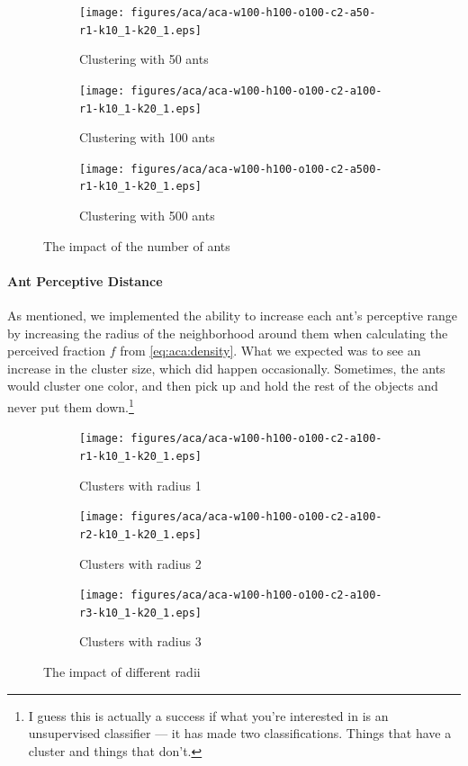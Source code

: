 \documentclass[12pt]{article}
\begin{document}
\begin{figure}[H]
    \begin{subfigure}[b]{0.32\textwidth}
        \centering
        \texttt{[image: figures/aca/aca-w100-h100-o100-c2-a50-r1-k10\_1-k20\_1.eps]}
        \caption{Clustering with 50 ants}\label{fig:aca:num-ants-50}
    \end{subfigure}
    \begin{subfigure}[b]{0.32\textwidth}
        \centering
        \texttt{[image: figures/aca/aca-w100-h100-o100-c2-a100-r1-k10\_1-k20\_1.eps]}
        \caption{Clustering with 100 ants}\label{fig:aca:num-ants-100}
    \end{subfigure}
    \begin{subfigure}[b]{0.32\textwidth}
        \centering
        \texttt{[image: figures/aca/aca-w100-h100-o100-c2-a500-r1-k10\_1-k20\_1.eps]}
        \caption{Clustering with 500 ants}\label{fig:aca:num-ants-200}
    \end{subfigure}
    \caption{The impact of the number of ants}\label{fig:aca:num-ants}
\end{figure}

\paragraph{Ant Perceptive Distance} As mentioned, we implemented the ability to increase each ant's perceptive range by increasing the radius of the neighborhood around them when calculating the perceived fraction $f$ from \autoref{eq:aca:density}.
What we expected was to see an increase in the cluster size, which did happen occasionally.
Sometimes, the ants would cluster one color, and then pick up and hold the rest of the objects and never put them down.\footnote{I guess this is actually a success if what you're interested in is an unsupervised classifier --- it has made two classifications. Things that have a cluster and things that don't.}

\begin{figure}[H]
    \begin{subfigure}[b]{0.32\textwidth}
        \centering
        \texttt{[image: figures/aca/aca-w100-h100-o100-c2-a100-r1-k10\_1-k20\_1.eps]}
        \caption{Clusters with radius 1}\label{fig:aca:radius-1}
    \end{subfigure}
    \begin{subfigure}[b]{0.32\textwidth}
        \centering
        \texttt{[image: figures/aca/aca-w100-h100-o100-c2-a100-r2-k10\_1-k20\_1.eps]}
        \caption{Clusters with radius 2}\label{fig:aca:radius-2}
    \end{subfigure}
    \begin{subfigure}[b]{0.32\textwidth}
        \centering
        \texttt{[image: figures/aca/aca-w100-h100-o100-c2-a100-r3-k10\_1-k20\_1.eps]}
        \caption{Clusters with radius 3}\label{fig:aca:radius-3}
    \end{subfigure}
    \caption{The impact of different radii}\label{fig:aca:radius}
\end{figure}
\end{document}
